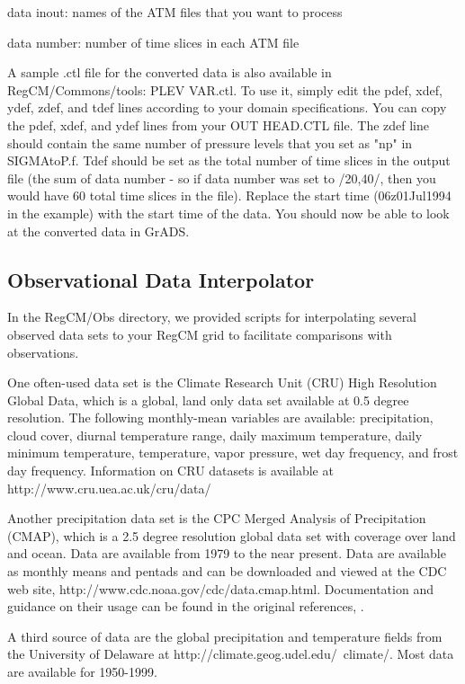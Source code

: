 data inout: names of the ATM files that you want to process

data number: number of time slices in each ATM file


A sample .ctl file for the converted data is also available in RegCM/Commons/tools: PLEV VAR.ctl. To use it, simply edit the pdef, xdef, ydef, zdef, and tdef lines according to your domain specifications. You can copy the pdef, xdef, and ydef lines from your OUT HEAD.CTL file. The zdef line should contain the same number of pressure levels that you set as "np" in SIGMAtoP.f. Tdef should be set as the total number of time slices in the output file (the sum of data number - so if data number was set to /20,40/, then you would have 60 total time slices in the file). Replace the start time (06z01Jul1994 in the example) with the start time of the data. You should now be able to look at the converted data in GrADS.


\subsection{Observational Data Interpolator}

In the RegCM/Obs directory, we provided scripts for interpolating several observed data sets to your RegCM grid to facilitate comparisons with observations. 

One often-used data set is the Climate Research Unit (CRU) High Resolution Global Data, which is a global, land only data set available at 0.5 degree resolution. The following monthly-mean variables are available: precipitation, cloud cover, diurnal temperature range, daily maximum temperature, daily minimum temperature, temperature, vapor pressure, wet day frequency, and frost day frequency. Information on CRU datasets is available at http://www.cru.uea.ac.uk/cru/data/

Another precipitation data set is the CPC Merged Analysis of Precipitation (CMAP), which is a 2.5 degree resolution global data set with coverage over land and ocean. Data are available from 1979 to the near present. Data are available as monthly means and pentads and can be downloaded and viewed at the CDC web site, http://www.cdc.noaa.gov/cdc/data.cmap.html. Documentation and guidance on their usage can be found in the original references, \citet{XieArkin_96,XieArkin_97}.

A third source of data are the global precipitation and temperature fields from the University of Delaware at http://climate.geog.udel.edu/~climate/. Most data are available for 1950-1999.

